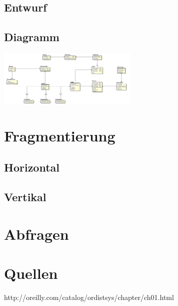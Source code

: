 \documentclass[12pt,a4paper]{report}
\begin{document}
	\section{Entwurf}
	\section{Diagramm}
	\includegraphics[width=0.5\textwidth]{ERD/MensaEr.png}
	\chapter{Fragmentierung}
	\section{Horizontal}
	\section{Vertikal}
	\chapter{Abfragen}
	\chapter{Quellen}
	http://oreilly.com/catalog/ordistsys/chapter/ch01.html
\end{document}
